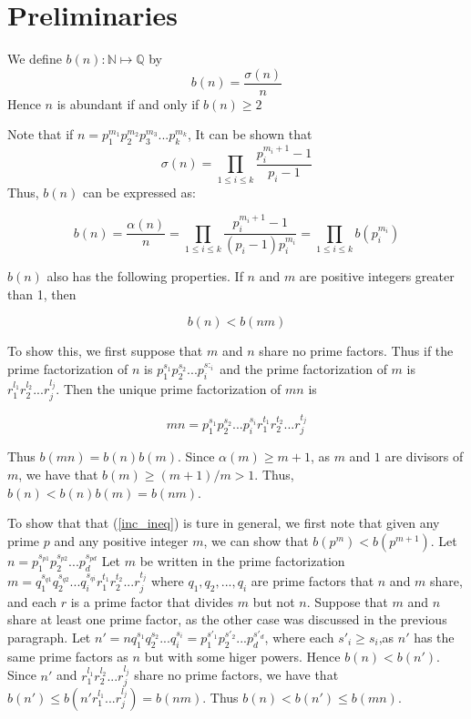 \documentclass[../paper.tex]{article}
\begin{document}
\section{Preliminaries}

We define $b(n): \mathbb{N} \mapsto \mathbb{Q}$ by
%
$$b(n) = \frac{\sigma(n)}{n} $$
%
Hence $n$ is abundant if and only if $b(n) \geq 2$

Note that if $n=p_1^{m_1}p_2^{m_2}p_3^{m_3}...p_{k}^{m_k}$,
It can be shown that 
%
$$\sigma(n) = \prod_{1 \leq i \leq k} \frac{p_i^{m_i + 1} -1}{p_i -1}$$
%
Thus, $b(n)$ can be expressed as:


\begin{equation}\label{b_stuff}
  b(n) = \frac{\alpha(n)}{n} = \prod_{1 \leq i \leq k} 
  \frac{p_i^{m_i + 1} -1}{(p_i -1)p_{i}^{m_{i}}}
  =\prod_{1 \leq i \leq k} b(p_i^{m_i})
\end{equation}

$b(n)$ also has the following properties. If $n$ and $m$ are positive
integers greater than 1, then 

\begin{equation}\label{inc_ineq}
  b(n) < b(nm) %
\end{equation}

To show this, we first suppose that $m$ and $n$ share no prime factors.
Thus if the prime factorization of $n$ is $p_1^{s_1} p_2^{s_2} ... p_i^{s:_i}$ 
and the prime factorization of $m$ is $r_1^{l_1} r_2^{l_2} ... r_j^{l_j}$.
Then the unique prime factorization of $mn$ is 

$$mn = p_1^{s_1} p_2^{s_2} ... p_i^{s_i} r_1^{t_1} r_2^{t_2} ... r_j^{t_j}$$

Thus $b(mn) = b(n)b(m)$. Since $\alpha(m) \geq m + 1$, as $m$ and 
$1$ are divisors of $m$, we have that $b(m) \geq (m + 1) / m > 1$.
Thus,
$b(n) < b(n)b(m) = b(nm)$. 


To show that that (\ref{inc_ineq}) is ture in general,
we first note that given any prime $p$ and
any positive integer $m$, we can show that $b(p^m) < b(p^{m + 1})$.
Let $n = p_1^{s_{p1}} p_2^{s_{p2}}... p_d^{s_{pd}}$ 
Let $m$ be written in the prime factorization 
$m = q_1^{s_{q1}} q_2^{s_{q2}} ... q_i^{s_{qi}} 
r_1^{t_1} r_2^{t_2} ... r_j^{t_j}$ where 
$q_1, q_2, ..., q_i$ are prime factors that $n$ and $m$ share,
and each $r$ is a prime factor that divides $m$ but not $n$.
Suppose that $m$ and $n$ share at least one prime factor, as the 
other case was discussed in the previous paragraph.
%
Let $n' = n q_1^{s_1} q_2^{s_2} ... q_i^{s_i} =
p_1^{s'_1} p_2^{s'_2} ... p_d^{s'_d}$, where each $s'_i \geq s_i$,as
$n'$ has the same prime factors as $n$ but with some higer powers.
Hence $b(n) < b(n')$. Since $n'$ and $r_1^{l_1} r_2^{l_2} ... r_j^{l_j}$
share no prime factors, we have that 
$b(n') \leq b(n' r_1^{l_1} ... r_j^{l_j}) = b(nm)$.
Thus $b(n) < b(n') \leq b(mn)$.
\end{document}
